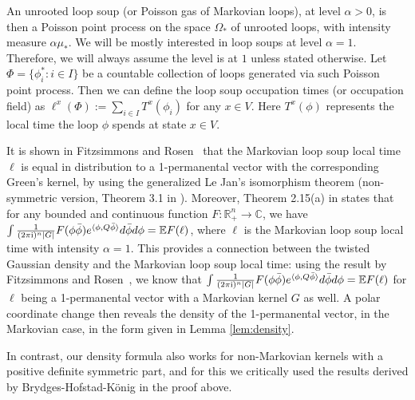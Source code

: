 \documentclass[a4paper, 11pt]{article}
\newcommand{\E}{\mathbb{E}}
\newcommand{\compi}{\textnormal{i}}
\begin{document}
An unrooted loop soup (or Poisson gas of Markovian loops), at level $\alpha > 0$, is then a Poisson point process on the space $\Omega_*$ of unrooted loops, with intensity measure $\alpha \mu_*$. We will be mostly interested in loop soups at level $\alpha=1$. Therefore, we will always assume the level is at $1$ unless stated otherwise. Let $\Phi=\{\phi_i^*: i\in I\}$ be a countable collection of loops generated via such Poisson point process. Then we can define the loop soup occupation times (or occupation field) as $\ell^x(\Phi):=\sum_{i\in I}T^x(\phi_i)$ for any $x\in V$. Here $T^x(\phi)$ represents the local time the loop $\phi$ spends at state $x\in V$.

It is shown in Fitzsimmons and Rosen~\cite{fr14} that the Markovian loop soup local time $\ell$ is equal in distribution to a 1-permanental vector with the corresponding
Green's kernel, by using the generalized Le Jan's isomorphism theorem (non-symmetric version, Theorem 3.1 in \cite{fr14}).
Moreover, Theorem 2.15(a) in \cite{av20} states that for any bounded and continuous function $F:\mathbb{R}_+^n\rightarrow \mathbb{C}$, we have $\int \frac{1}{(2\pi \compi)^n|G|}F(\phi \bar{\phi})e^{\langle \phi,Q\bar{\phi}\rangle}d\bar{\phi} d\phi =\E F(\ell)$, where $\ell$ is the Markovian loop soup local time with intensity $\alpha=1$. This provides a connection between the
twisted Gaussian density and the Markovian loop soup local time: using the result by Fitzsimmons and Rosen~\cite{fr14}, we know that $\int \frac{1}{(2\pi \compi)^n|G|}F(\phi \bar{\phi})e^{\langle \phi, Q\bar{\phi}\rangle}d\bar{\phi} d\phi =\E F(\ell)$ for $\ell$ being a 1-permanental vector with a Markovian kernel $G$ as well. A polar coordinate change then reveals the density of the
1-permanental vector, in the Markovian case, in the form given in Lemma \ref{lem:density}.

In contrast, our density formula also works for non-Markovian kernels with a positive definite symmetric part,  and for this
we critically used the results derived by Brydges-Hofstad-König\cite{bhk07} in the proof above.
\end{document}
